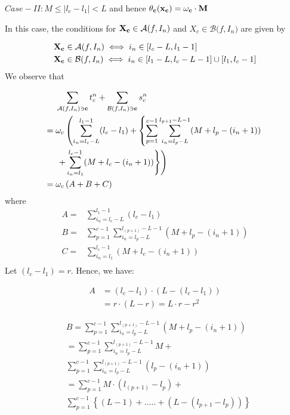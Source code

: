 \documentclass[10pt,letterpaper]{article}
\begin{document}
$Case - II: M \leq |l_c - l_1| < L$ and hence $\theta_{\bf c}(\bf{x_c}) = \omega_c \cdot M$

In this case, the conditions for ${\bf X_c} \in \mathcal{A}\mathit(f, I_n)$ and $X_c \in \mathcal{B}\mathit(f, I_n)$ are given by

\begin{align*}
& {\bf X_c} \in \mathcal{A}\mathit(f, I_n) \iff i_n \in [l_c - L, l_1 - 1] \\
& {\bf X_c} \in \mathcal{B}\mathit(f, I_n) \iff i_n \in [l_1 - L, l_c - L - 1] \cup [l_1, l_c - 1]\\
\end{align*}
We observe that

\begin{align*}
	& \sum_{\mathcal{A}\mathit(f, I_n) \ni {\bf c}} t_c^n + \sum_{\mathcal{B}\mathit(f, I_n) \ni {\bf c}} s_c^n \\
	={}  & \omega_c \left( \sum_{i_n = l_c - L}^{l_1 - 1} (l_c - l_1) + \left\{ \sum_{p = 1}^{c-1} \sum_{i_n = l_p - L}^{l_{p+1}-L-1} (M + l_p - (i_n + 1)) \right.\right.\\ 
	     & \left. \left. + \sum_{i_n = l_1}^{l_c -1} (M + l_c - (i_n + 1)) \right\}\right)\\        
	={} & \omega_c \left( A + B + C \right) \\
\end{align*}
where
\begin{align*}
	A  ={} &\sum_{i_n = l_c - L}^{l_1 - 1} (l_c - l_1) \\
	B  ={} &\sum_{p = 1}^{c-1} \sum_{i_n = l_p - L}^{l_{(p+1)}-L-1} (M + l_p - (i_n + 1)) \\
	C  ={} &\sum_{i_n = l_1}^{l_c -1} (M + l_c - (i_n + 1)) \\
\end{align*}
Let $(l_c - l_1) = r$. Hence, we have:

\begin{align}
	A & = (l_c - l_1)\cdot(L - (l_c - l_1)) \nonumber\\
	  & = r \cdot (L - r) = L \cdot r - r^2 \label{eq:Aexpr}
\end{align}

\begin{align*}
	& B = \sum_{p = 1}^{c-1} \sum_{i_n = l_p - L}^{l_{(p+1)}-L-1} (M + l_p - (i_n + 1)) \\
	&  = \sum_{p = 1}^{c-1} \sum_{i_n = l_p - L}^{l_{(p+1)}-L-1} M + \\
	& \sum_{p = 1}^{c-1} \sum_{i_n = l_p - L}^{l_{(p+1)}-L-1} (l_p - (i_n + 1)) \\
	& = \sum_{p = 1}^{c-1} M \cdot (l_{(p+1)} - l_p) +  \\
	& \sum_{p = 1}^{c-1}\left\{(L-1) +.....+ (L-(l_{p+1}-l_p))\right\} \\
\end{align*}
\end{document}
